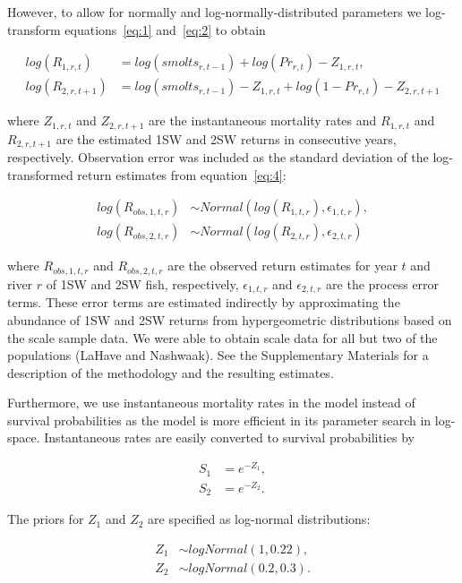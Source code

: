 \documentclass[12pt]{article}
\begin{document}
However, to allow for normally and log-normally-distributed parameters we
log-transform equations~\ref{eq:1} and~\ref{eq:2} to obtain

\begin{align}
    log(R_{1,r,t}) &= log(smolts_{r,t-1}) + log(Pr_{r,t}) - Z_{1,r,t} \label{eq:3}, \\
    log(R_{2,r,t+1}) &= log(smolts_{r,t-1}) - Z_{1,r,t} + log(1 - Pr_{r,t})  - Z_{2,r,t+1} \label{eq:4} 
\end{align}

where $Z_{1,r,t}$ and $Z_{2,r,t+1}$ are the instantaneous mortality rates and
$R_{1,r,t}$ and $R_{2,r,t+1}$ are the estimated 1SW and 2SW returns in
consecutive years, respectively. Observation error was included as the
standard deviation of the log-transformed return estimates from
equation~\ref{eq:4}:

\begin{align}
log(R_{obs,1,t,r}) &\sim Normal(log(R_{1,t,r}), \epsilon_{1,t,r}), \\
log(R_{obs,2,t,r}) &\sim Normal(log(R_{2,t,r}), \epsilon_{2,t,r}) \label{eq:5} 
\end{align}

where $R_{obs,1,t,r}$ and $R_{obs,2,t,r}$ are the observed return estimates
for year $t$ and river $r$ of 1SW and 2SW fish, respectively, $\epsilon_{1,t,r}$
and $\epsilon_{2,t,r}$ are the process error terms. 
These error terms are estimated indirectly by approximating the abundance of 1SW and 2SW returns
from hypergeometric distributions based on the scale sample data. 
We were able to obtain scale data for all but two of the populations (LaHave and Nashwaak).
See the Supplementary Materials for a description of the methodology and the resulting estimates.

Furthermore, we use instantaneous mortality rates in the model instead of
survival probabilities as the model is more efficient in its parameter search
in log-space. Instantaneous rates are easily converted to survival
probabilities by 

\begin{align}
 S_{1} &= e^{-Z_1}, \\
 S_{2} &= e^{-Z_2}. 
\end{align}

The priors for $Z_1$ and $Z_2$ are specified as log-normal distributions:

\begin{align}
Z_1 &\sim logNormal(1, 0.22),   \\ 
Z_2 &\sim logNormal(0.2, 0.3).
\end{align}
\end{document}
